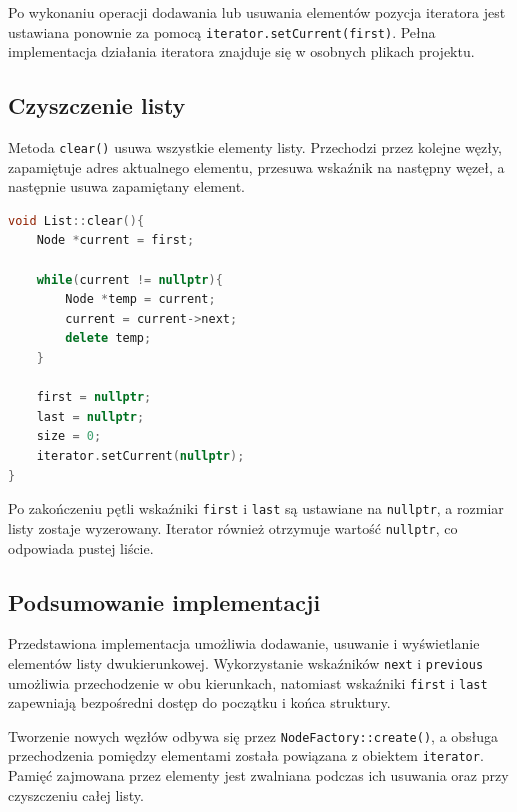 Po wykonaniu operacji dodawania lub usuwania elementów pozycja iteratora jest ustawiana ponownie za pomocą \texttt{iterator.setCurrent(first)}. Pełna implementacja działania iteratora znajduje się w osobnych plikach projektu.

\subsection{Czyszczenie listy}

Metoda \texttt{clear()} usuwa wszystkie elementy listy. Przechodzi przez kolejne węzły, zapamiętuje adres aktualnego elementu, przesuwa wskaźnik na następny węzeł, a następnie usuwa zapamiętany element.

\begin{lstlisting}[language=C++, caption={Usuwanie wszystkich elementów listy}]
void List::clear(){
    Node *current = first;

    while(current != nullptr){
        Node *temp = current;
        current = current->next;
        delete temp;
    }

    first = nullptr;
    last = nullptr;
    size = 0;
    iterator.setCurrent(nullptr);
}
\end{lstlisting}

Po zakończeniu pętli wskaźniki \texttt{first} i \texttt{last} są ustawiane na \texttt{nullptr}, a rozmiar listy zostaje wyzerowany. Iterator również otrzymuje wartość \texttt{nullptr}, co odpowiada pustej liście.

\subsection{Podsumowanie implementacji}

Przedstawiona implementacja umożliwia dodawanie, usuwanie i wyświetlanie elementów listy dwukierunkowej. Wykorzystanie wskaźników \texttt{next} i \texttt{previous} umożliwia przechodzenie w obu kierunkach, natomiast wskaźniki \texttt{first} i \texttt{last} zapewniają bezpośredni dostęp do początku i końca struktury.

Tworzenie nowych węzłów odbywa się przez \texttt{NodeFactory::create()}, a obsługa przechodzenia pomiędzy elementami została powiązana z obiektem \texttt{iterator}. Pamięć zajmowana przez elementy jest zwalniana podczas ich usuwania oraz przy czyszczeniu całej listy.
